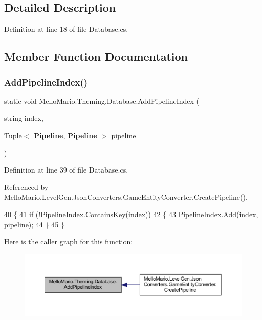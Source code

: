 \subsection{Detailed Description}


Definition at line 18 of file Database.\+cs.



\subsection{Member Function Documentation}
\mbox{\label{classMelloMario_1_1Theming_1_1Database_aba40c92601ea18066a992fa8a73b4369}} 
\subsubsection{Add\+Pipeline\+Index()}
{\footnotesize\ttfamily static void Mello\+Mario.\+Theming.\+Database.\+Add\+Pipeline\+Index (\begin{DoxyParamCaption}\item[{string}]{index,  }\item[{Tuple$<$ \textbf{ Pipeline}, \textbf{ Pipeline} $>$}]{pipeline }\end{DoxyParamCaption})\hspace{0.3cm}{\ttfamily [static]}}



Definition at line 39 of file Database.\+cs.



Referenced by Mello\+Mario.\+Level\+Gen.\+Json\+Converters.\+Game\+Entity\+Converter.\+Create\+Pipeline().


\begin{DoxyCode}
40         \{
41             \textcolor{keywordflow}{if} (!PipelineIndex.ContainsKey(index))
42             \{
43                 PipelineIndex.Add(index, pipeline);
44             \}
45         \}
\end{DoxyCode}
Here is the caller graph for this function\+:
\nopagebreak
\begin{figure}[H]
\begin{center}
\leavevmode
\includegraphics[width=350pt]{classMelloMario_1_1Theming_1_1Database_aba40c92601ea18066a992fa8a73b4369_icgraph}
\end{center}
\end{figure}
\mbox{\label{classMelloMario_1_1Theming_1_1Database_a6f8e0f7198be465c49296ed08ed82cc5}} 
